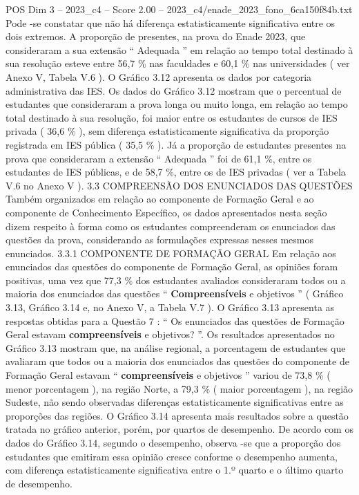 \begin{textsample}{POS Dim 3 – 2023\_c4 – Score 2.00 – 2023\_c4/enade\_2023\_fono\_6ca150f84b.txt}
Pode -se constatar que não há diferença estatisticamente significativa entre os dois extremos.
A proporção de presentes, na prova do Enade 2023, que consideraram a sua extensão “ Adequada ” em relação ao tempo total destinado à sua resolução esteve entre 56,7 \% nas faculdades e 60,1 \% nas universidades ( ver Anexo V, Tabela V.6 ).
O Gráfico 3.12 apresenta os dados por categoria administrativa das IES.
Os dados do Gráfico 3.12 mostram que o percentual de estudantes que consideraram a prova longa ou muito longa, em relação ao tempo total destinado à sua resolução, foi maior entre os estudantes de cursos de IES privada ( 36,6 \% ), sem diferença estatisticamente significativa da proporção registrada em IES pública ( 35,5 \% ).
Já a proporção de estudantes presentes na prova que consideraram a extensão “ Adequada ” foi de 61,1 \%, entre os estudantes de IES públicas, e de 58,7 \%, entre os de IES privadas ( ver a Tabela V.6 no Anexo V ). 3.3 COMPREENSÃO DOS ENUNCIADOS DAS QUESTÕES Também organizados em relação ao componente de Formação Geral e ao componente de Conhecimento Específico, os dados apresentados nesta seção dizem respeito à forma como os estudantes compreenderam os enunciados das questões da prova, considerando as formulações expressas nesses mesmos enunciados. 3.3.1 COMPONENTE DE FORMAÇÃO GERAL Em relação aos enunciados das questões do componente de Formação Geral, as opiniões foram positivas, uma vez que 77,3 \% dos estudantes avaliados consideraram todos ou a maioria dos enunciados das questões “ \textbf{Compreensíveis} e objetivos ” ( Gráfico 3.13, Gráfico 3.14 e, no Anexo V, a Tabela V.7 ).
O Gráfico 3.13 apresenta as respostas obtidas para a Questão 7 : “ Os enunciados das questões de Formação Geral estavam \textbf{compreensíveis} e objetivos? ”.
Os resultados apresentados no Gráfico 3.13 mostram que, na análise regional, a porcentagem de estudantes que avaliaram que todos ou a maioria dos enunciados das questões do componente de Formação Geral estavam “ \textbf{compreensíveis} e objetivos ” variou de 73,8 \% ( menor porcentagem ), na região Norte, a 79,3 \% ( maior porcentagem ), na região Sudeste, não sendo observadas diferenças estatisticamente significativas entre as proporções das regiões.
O Gráfico 3.14 apresenta mais resultados sobre a questão tratada no gráfico anterior, porém, por quartos de desempenho.
De acordo com os dados do Gráfico 3.14, segundo o desempenho, observa -se que a proporção dos estudantes que emitiram essa opinião cresce conforme o desempenho aumenta, com diferença estatisticamente significativa entre o 1.º quarto e o último quarto de desempenho.

\end{textsample}
